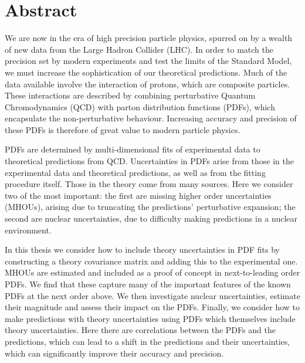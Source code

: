 \chapter{Abstract}
We are now in the era of high precision particle physics, spurred on by a wealth of new data from the Large Hadron Collider (LHC). In order to match the precision set by modern experiments and test the limits of the Standard Model, we must increase the sophistication of our theoretical predictions. Much of the data available involve the interaction of protons, which are composite particles. These interactions are described by combining perturbative Quantum Chromodynamics (QCD) with parton distribution functions (PDFs), which encapsulate the non-perturbative behaviour. Increasing accuracy and precision of these PDFs is therefore of great value to modern particle physics.

PDFs are determined by multi-dimensional fits of experimental data to theoretical predictions from QCD. Uncertainties in PDFs arise from those in the experimental data and theoretical predictions, as well as from the fitting procedure itself. Those in the theory come from many sources. Here we consider two of the most important: the first are missing higher order uncertainties (MHOUs), arising due to truncating the predictions' perturbative expansion; the second are nuclear uncertainties, due to difficulty making predictions in a nuclear environment.

In this thesis we consider how to include theory uncertainties in PDF fits by constructing a theory covariance matrix and adding this to the experimental one. MHOUs are estimated and included as a proof of concept in next-to-leading order PDFs. We find that these capture many of the important features of the known PDFs at the next order above. We then investigate nuclear uncertainties, estimate their magnitude and assess their impact on the PDFs. Finally, we consider how to make predictions with theory uncertainties using PDFs which themselves include theory uncertainties. Here there are correlations between the PDFs and the predictions, which can lead to a shift in the predictions and their uncertainties, which can significantly improve their accuracy and precision.
